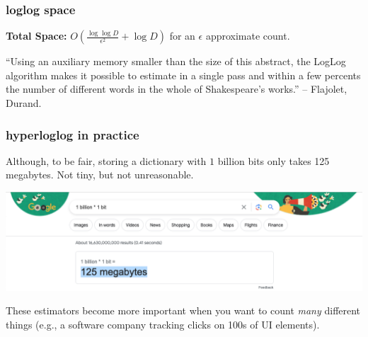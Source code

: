\documentclass[compress]{beamer}
\begin{document}
\begin{frame}
	\frametitle{loglog space}
	\textbf{Total Space:} $O \left (\frac{\log \log D}{\epsilon^2} + \log D \right )$ for an $\epsilon$ approximate count.
	
	\small ``Using an auxiliary memory smaller than the size of this abstract, the LogLog algorithm makes it possible to estimate in a single pass and within a few percents the number of different words in the whole of Shakespeare’s works.'' -- Flajolet, Durand.
	
	
	\vspace{1em}
\end{frame}

\begin{frame}
	\frametitle{hyperloglog in practice}
	\begin{center} 
		Although, to be fair, storing a dictionary with $1$ billion bits only takes 125 megabytes. Not tiny, but not unreasonable.
		
		\includegraphics[width=\textwidth]{google_bit_calculations.png}
	\end{center}
	These estimators become more important when you want to count \emph{many} different things (e.g., a software company tracking clicks on 100s of UI elements).
\end{frame}
\end{document}

